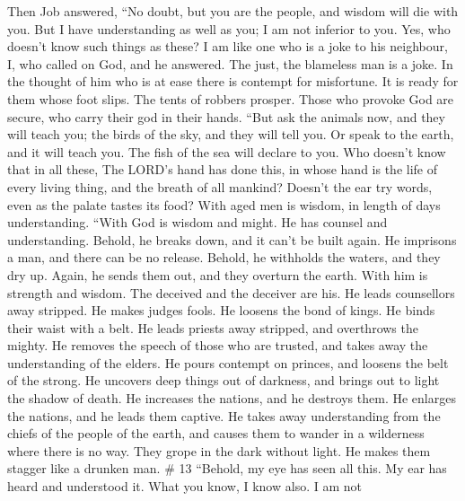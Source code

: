  Then Job answered,  ``No doubt, but you are
the people, and wisdom will die with you.  But I have
understanding as well as you; I am not inferior to you. Yes, who doesn't
know such things as these?  I am like one who is a joke to
his neighbour, I, who called on God, and he answered. The just, the
blameless man is a joke.  In the thought of him who is at
ease there is contempt for misfortune. It is ready for them whose foot
slips.  The tents of robbers prosper. Those who provoke
God are secure, who carry their god in their hands.  ``But
ask the animals now, and they will teach you; the birds of the sky, and
they will tell you.  Or speak to the earth, and it will
teach you. The fish of the sea will declare to you.  Who
doesn't know that in all these, The LORD's hand has done this,
 in whose hand is the life of every living thing, and the
breath of all mankind?  Doesn't the ear try words, even
as the palate tastes its food?  With aged men is wisdom,
in length of days understanding.  ``With God is wisdom
and might. He has counsel and understanding.  Behold, he
breaks down, and it can't be built again. He imprisons a man, and there
can be no release.  Behold, he withholds the waters, and
they dry up. Again, he sends them out, and they overturn the earth.
 With him is strength and wisdom. The deceived and the
deceiver are his.  He leads counsellors away stripped. He
makes judges fools.  He loosens the bond of kings. He
binds their waist with a belt.  He leads priests away
stripped, and overthrows the mighty.  He removes the
speech of those who are trusted, and takes away the understanding of the
elders.  He pours contempt on princes, and loosens the
belt of the strong.  He uncovers deep things out of
darkness, and brings out to light the shadow of death. 
He increases the nations, and he destroys them. He enlarges the nations,
and he leads them captive.  He takes away understanding
from the chiefs of the people of the earth, and causes them to wander in
a wilderness where there is no way.  They grope in the
dark without light. He makes them stagger like a drunken man. \# 13
 ``Behold, my eye has seen all this. My ear has heard and
understood it.  What you know, I know also. I am not
